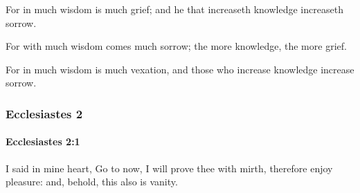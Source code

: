 			\begin{versebox}
					\item[BHS] 
					\item[LXX] 
					\item[ASV] For in much wisdom is much grief; and he that increaseth knowledge increaseth sorrow.
					\item[NIV] For with much wisdom comes much sorrow; the more knowledge, the more grief.
					\item[NRSV] For in much wisdom is much vexation, and those who increase knowledge increase sorrow.
			\end{versebox}
	\subsubsection{Ecclesiastes 2} %
		\label{ECCLESIASTES-2}

		\paragraph{Ecclesiastes 2:1} %
			\label{ECCLESIASTES-2-1}

			I said in mine heart, Go to now, I will prove thee with mirth, therefore enjoy pleasure: and, behold, this also is vanity.

